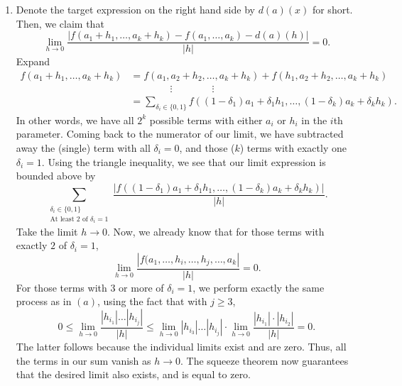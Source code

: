 \documentclass[11pt]{report}
\begin{document}
\begin{enumerate}
        \item Denote the target expression on the right hand side by $d(a)(x)$ for
        short. Then, we claim that \[
            \lim_{h \to 0} \frac{|f(a_1 + h_1, \dots, a_k + h_k) - f(a_1, \dots, a_k)
            - d(a)(h)|}{|h|} = 0.
        \] Expand \begin{align*}
            f(a_1 + h_1, \dots, a_k + h_k) &= f(a_1, a_2 + h_2, \dots, a_k + h_k) +
            f(h_1, a_2 + h_2, \dots, a_k + h_k) \\
            &\qquad\qquad \vdots \qquad\qquad\vdots\\
            &= \sum_{\delta_i \in \{0, 1\}} f((1 - \delta_1)a_1 + \delta_1h_1, \dots,
            (1 - \delta_k)a_k + \delta_kh_k).
        \end{align*}
        In other words, we have all $2^k$ possible terms with either $a_i$ or $h_i$ in the $i$th parameter. Coming back to the numerator of our limit, we
        have subtracted away the (single) term with all $\delta_i = 0$, and those
        ($k$) terms with exactly one $\delta_i = 1$. Using the triangle inequality,
        we see that our limit expression is bounded above by \[
            \sum_{\substack{\delta_i \in \{0, 1\} \\ \text{At least 2 of }
            \delta_i = 1}} \frac{|f((1 - \delta_1)a_1 + \delta_1h_1, \dots, (1 -
            \delta_k)a_k + \delta_kh_k)|}{|h|}.
        \] Take the limit $h \to 0$. Now, we already know that for those terms with
        exactly $2$ of $\delta_i = 1$, \[
            \lim_{h \to 0} \frac{|f(a_1, \dots, h_i, \dots, h_j, \dots, a_k|}{|h|} =
            0.
        \] For those terms with $3$ or more of $\delta_i = 1$, we perform exactly
        the same process as in $(a)$, using the fact that with $j \geq 3$, \[
            0 \leq \lim_{h \to 0} \frac{|h_{i_1}|\dots|h_{i_j}|}{|h|} \leq \lim_{h \to 0}
            |h_{i_3}|\dots |h_{i_j}| \cdot \lim_{h \to 0}
            \frac{|h_{i_1}|\cdot|h_{i_2}|}{|h|} = 0.
        \] The latter follows because the individual limits exist and are zero. Thus,
        all the terms in our sum vanish as $h \to 0$. The squeeze theorem now
        guarantees that the desired limit also exists, and is equal to zero.
    \end{enumerate}
\end{document}
